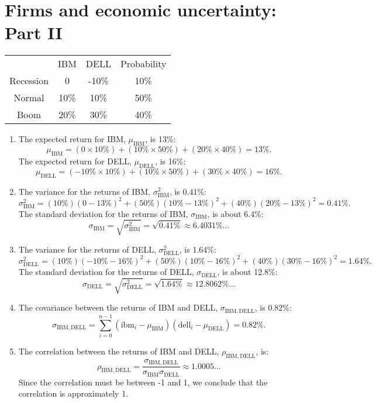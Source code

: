 \documentclass[12pt]{article}
\begin{document}
\section{Firms and economic uncertainty: Part II}
\begin{center}\begin{tabular}{c||c|c|c}
&IBM&DELL&Probability\\
Recession&0&-10\%&10\%\\
Normal&10\%&10\%&50\%\\
Boom&20\%&30\%&40\%
\end{tabular}\end{center}
\begin{enumerate}
    \item The expected return for IBM, $\mu_{\mathrm{IBM}}$, is 13\%:
    \[\mu_{\mathrm{IBM}}=(0\times 10\%)+(10\%\times 50\%)+(20\%\times 40\%)=13\%.\]
    The expected return for DELL, $\mu_{\mathrm{DELL}}$, is 16\%:
    \[\mu_{\mathrm{DELL}}=(-10\%\times 10\%)+(10\%\times 50\%)+(30\%\times 40\%)=16\%.\]
    \item The variance for the returns of IBM, $\sigma^2_{\mathrm{IBM}}$, is 0.41\%:
    \[\sigma^2_{\mathrm{IBM}}=(10\%)(0-13\%)^2+(50\%)(10\%-13\%)^2+(40\%)(20\%-13\%)^2=0.41\%.\]
    The standard deviation for the returns of IBM, $\sigma_{\mathrm{IBM}}$, is about 6.4\%:
    \[\sigma_{\mathrm{IBM}}=\sqrt{\sigma^2_{\mathrm{IBM}}}=\sqrt{0.41\%}\approx 6.4031\%\dots\]
    \item The variance for the returns of DELL, $\sigma^2_{\mathrm{DELL}}$, is 1.64\%:
    \[\sigma^2_{\mathrm{DELL}}=(10\%)(-10\%-16\%)^2+(50\%)(10\%-16\%)^2+(40\%)(30\%-16\%)^2=1.64\%.\]
    The standard deviation for the returns of DELL, $\sigma_{\mathrm{DELL}}$, is about 12.8\%:
    \[\sigma_{\mathrm{DELL}}=\sqrt{\sigma^2_{\mathrm{DELL}}}=\sqrt{1.64\%}\approx 12.8062\%\dots\]
    \item The covariance between the returns of IBM and DELL, $\sigma_{\mathrm{IBM},\mathrm{DELL}}$, is 0.82\%:
    \[\sigma_{\mathrm{IBM},\mathrm{DELL}}=\sum_{i=0}^{n-1}(\mathrm{ibm}_i-\mu_{\mathrm{IBM}})(\mathrm{dell}_i-\mu_{\mathrm{DELL}})=0.82\%.\]
    \item The correlation between the returns of IBM and DELL, $\rho_{\mathrm{IBM},\mathrm{DELL}}$, is:
    \[\rho_{\mathrm{IBM},\mathrm{DELL}}=\frac{\sigma_{\mathrm{IBM},\mathrm{DELL}}}{\sigma_{\mathrm{IBM}}\sigma_{\mathrm{DELL}}}\approx 1.0005\dots\]
    Since the correlation must be between -1 and 1, we conclude that the correlation is approximately 1.
\end{enumerate}
\end{document}
